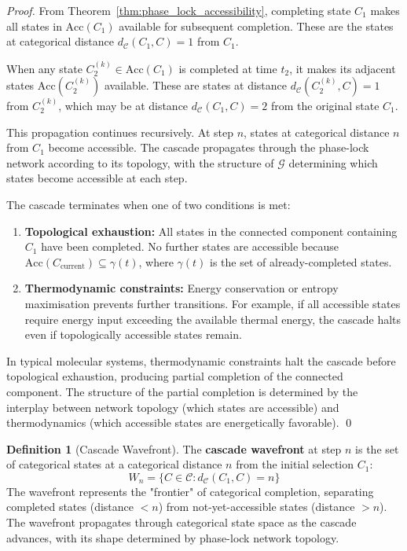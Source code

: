 \documentclass[12pt,a4paper]{article}
\theoremstyle{definition}
\newtheorem{definition}[theorem]{Definition}
\theoremstyle{remark}
\newcommand{\phaselockgraph}{\mathcal{G}}
\newcommand{\catspace}{\mathcal{C}}
\newcommand{\accessible}{\text{Acc}}
\begin{document}
\begin{proof}
From Theorem~\ref{thm:phase_lock_accessibility}, completing state $C_1$ makes all states in $\accessible(C_1)$ available for subsequent completion. These are the states at categorical distance $d_{\catspace}(C_1, C) = 1$ from $C_1$.

When any state $C_2^{(k)} \in \accessible(C_1)$ is completed at time $t_2$, it makes its adjacent states $\accessible(C_2^{(k)})$ available. These are states at distance $d_{\catspace}(C_2^{(k)}, C) = 1$ from $C_2^{(k)}$, which may be at distance $d_{\catspace}(C_1, C) = 2$ from the original state $C_1$.

This propagation continues recursively. At step $n$, states at categorical distance $n$ from $C_1$ become accessible. The cascade propagates through the phase-lock network according to its topology, with the structure of $\phaselockgraph$ determining which states become accessible at each step.

The cascade terminates when one of two conditions is met:

\begin{enumerate}
    \item \textbf{Topological exhaustion:} All states in the connected component containing $C_1$ have been completed. No further states are accessible because $\accessible(C_{\text{current}}) \subseteq \gamma(t)$, where $\gamma(t)$ is the set of already-completed states.

    \item \textbf{Thermodynamic constraints:} Energy conservation or entropy maximisation prevents further transitions. For example, if all accessible states require energy input exceeding the available thermal energy, the cascade halts even if topologically accessible states remain.
\end{enumerate}

In typical molecular systems, thermodynamic constraints halt the cascade before topological exhaustion, producing partial completion of the connected component. The structure of the partial completion is determined by the interplay between network topology (which states are accessible) and thermodynamics (which accessible states are energetically favorable). \qed
\end{proof}

\begin{definition}[Cascade Wavefront]
\label{def:cascade_wavefront}
The \textbf{cascade wavefront} at step $n$ is the set of categorical states at a categorical distance $n$ from the initial selection $C_1$:
\begin{equation}
W_n = \{C \in \catspace : d_{\catspace}(C_1, C) = n\}
\end{equation}
The wavefront represents the "frontier" of categorical completion, separating completed states (distance $< n$) from not-yet-accessible states (distance $> n$). The wavefront propagates through categorical state space as the cascade advances, with its shape determined by phase-lock network topology.
\end{definition}
\end{document}
